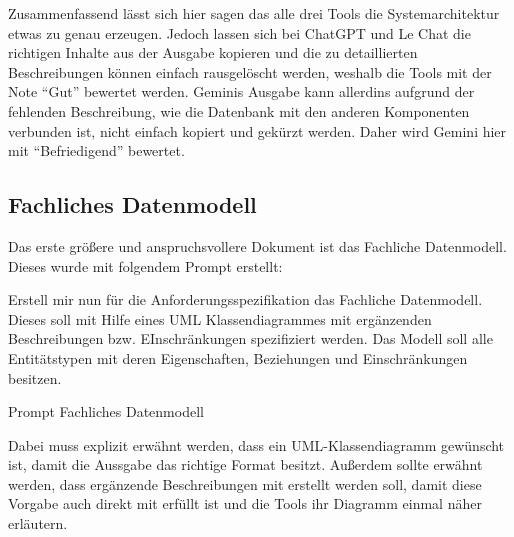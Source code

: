 Zusammenfassend lässt sich hier sagen das alle drei Tools die Systemarchitektur etwas zu genau erzeugen. Jedoch lassen sich bei ChatGPT und Le Chat die richtigen Inhalte 
aus der Ausgabe kopieren und die zu detaillierten Beschreibungen können einfach rausgelöscht werden, weshalb die Tools mit der Note ``Gut'' bewertet werden. Geminis Ausgabe
kann allerdins aufgrund der fehlenden Beschreibung, wie die Datenbank mit den anderen Komponenten verbunden ist, nicht einfach kopiert und gekürzt werden. Daher wird Gemini 
hier mit ``Befriedigend'' bewertet.


\subsection*{Fachliches Datenmodell}

Das erste größere und anspruchsvollere Dokument ist das Fachliche Datenmodell. Dieses wurde mit folgendem Prompt erstellt:

\begin{prompt}[H]
    \begin{tcolorbox}[colback=gray!20, colframe=gray!20, boxrule=0pt, sharp corners] 
        Erstell mir nun für die Anforderungsspezifikation das Fachliche Datenmodell. Dieses soll mit Hilfe eines UML Klassendiagrammes mit ergänzenden Beschreibungen 
        bzw. EInschränkungen spezifiziert werden. Das Modell soll alle Entitätstypen mit deren Eigenschaften, Beziehungen und Einschränkungen besitzen.
        \vfill
    \end{tcolorbox}
    \caption{Prompt Fachliches Datenmodell}
    \label{Prompt Fachliches Datenmodell}
\end{prompt}

Dabei muss explizit erwähnt werden, dass ein UML-Klassendiagramm gewünscht ist, damit die Aussgabe das richtige Format besitzt. Außerdem sollte erwähnt werden,
dass ergänzende Beschreibungen mit erstellt werden soll, damit diese Vorgabe auch direkt mit erfüllt ist und die Tools ihr Diagramm einmal näher erläutern.\\

